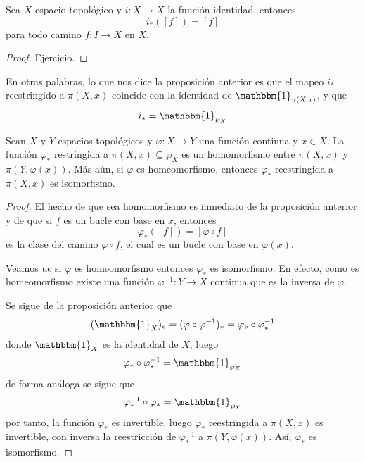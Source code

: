 \documentclass[12pt]{report}
\theoremstyle{largebreak}
\newcommand\cf[3]{\ensuremath{#1:#2\rightarrow#3}}
\newcommand{\bbm}[1]{\ensuremath{\mathbbm{#1}}}
\begin{document}
    \begin{excer}
        Sea $X$ espacio topológico y $\cf{i}{X}{X}$ la función identidad, entonces
        \begin{equation*}
            i_*([f])=[f]
        \end{equation*}
        para todo camino $\cf{f}{I}{X}$ en $X$.
    \end{excer}

    \begin{proof}
        Ejercicio.
    \end{proof}

    \begin{obs}
        En otras palabras, lo que nos dice la proposición anterior es que el mapeo $i_*$ reestringido a $\pi(X,x)$ coincide con la identidad de $\bbm{1}_{\pi(X,x)}$, y que
        \begin{equation*}
            i_*=\bbm{1}_{\wp_X}
        \end{equation*}
    \end{obs}
    
    \begin{cor}
        Sean $X$ y $Y$ espacios topológicos y $\cf{\varphi}{X}{Y}$ una función continua y $x\in X$. La función $\varphi_*$ restringida a $\pi(X,x)\subseteq\wp_X$ es un homomorfismo entre $\pi(X,x)$ y $\pi(Y,\varphi(x))$. Más aún, si $\varphi$ es homeomorfismo, entonces $\varphi_*$ reestringida a $\pi(X,x)$ es isomorfismo.
    \end{cor}

    \begin{proof}
        El hecho de que sea homomorfismo es inmediato de la proposición anterior y de que si $f$ es un bucle con base en $x$, entonces
        \begin{equation*}
            \varphi_*([f])=[\varphi\circ f]
        \end{equation*}
        es la clase del camino $\varphi\circ f$, el cual es un bucle con base en $\varphi(x)$.

        Veamos ue si $\varphi$ es homeomorfismo entonces $\varphi_*$ es isomorfismo. En efecto, como es homeomorfismo existe una función $\cf{\varphi^{-1}}{Y}{X}$ continua que es la inversa de $\varphi$.

        Se sigue de la proposición anterior que
        \begin{equation*}
            (\bbm{1}_X)_*=(\varphi\circ\varphi^{-1})_*=\varphi_*\circ\varphi_*^{-1}
        \end{equation*}
        donde $\bbm{1}_X$ es la identidad de $X$, luego
        \begin{equation*}
            \varphi_*\circ\varphi_*^{-1}=\bbm{1}_{\wp_X}
        \end{equation*}
        de forma análoga se sigue que
        \begin{equation*}
            \varphi_*^{-1}\circ\varphi_*=\bbm{1}_{\wp_Y}
        \end{equation*}
        por tanto, la función $\varphi_*$ es invertible, luego $\varphi_*$ reestringida a $\pi(X,x)$ es invertible, con inversa la reestricción de $\varphi_*^{-1}$ a $\pi(Y,\varphi(x))$. Así, $\varphi_*$ es isomorfismo.
    \end{proof}
\end{document}
